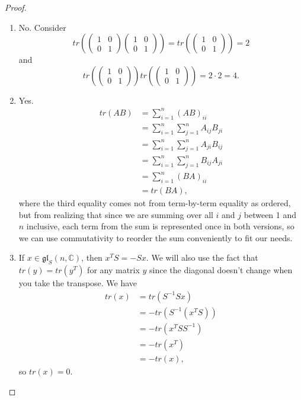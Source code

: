 \documentclass[12pt]{article}
\newcommand{\gl}{\mathfrak{gl}}
\theoremstyle{definition}
\begin{document}
\begin{proof}\
	\begin{enumerate}[label=(\alph*)]
		\item No.
		      Consider \begin{equation*}
			      tr \left( \begin{pmatrix}1 & 0 \\ 0 & 1\end{pmatrix}\begin{pmatrix}1 & 0 \\ 0 & 1\end{pmatrix} \right) = tr \left( \begin{pmatrix}1 & 0 \\ 0 & 1\end{pmatrix} \right) = 2
		      \end{equation*}
		      and \begin{equation*}
			      tr \left( \begin{pmatrix}1 & 0 \\ 0 & 1\end{pmatrix}\right) tr\left(\begin{pmatrix}1 & 0 \\ 0 & 1\end{pmatrix} \right) = 2 \cdot 2 = 4.
		      \end{equation*}
		\item Yes. \begin{align*}
			      tr(AB) & = \sum_{i=1}^n (AB)_{ii}                 \\
			             & = \sum_{i=1}^n \sum_{j=1}^n A_{ij}B_{ji} \\
			             & = \sum_{i=1}^n \sum_{j=1}^n A_{ji}B_{ij} \\
			             & = \sum_{i=1}^n \sum_{j=1}^n B_{ij}A_{ji} \\
			             & = \sum_{i=1}^n (BA)_{ii}                 \\
			             & = tr(BA),
		      \end{align*}
		      where the third equality comes not from term-by-term equality as ordered, but from realizing that since we are summing over all $i$ and $j$ between 1 and $n$ inclusive, each term from the sum is represented once in both versions, so we can use commutativity to reorder the sum conveniently to fit our needs.
		\item If $x \in \gl_S(n, \mathbb{C})$, then $x^TS = -Sx$.
		      We will also use the fact that $tr(y) = tr(y^T)$ for any matrix $y$ since the diagonal doesn't change when you take the transpose.
		      We have \begin{align*}
			      tr(x) & = tr(S^{-1}Sx)      \\
			            & = -tr(S^{-1}(x^TS)) \\
			            & = -tr(x^TSS^{-1})   \\
			            & = -tr(x^T)          \\
			            & = -tr(x),
		      \end{align*}
		      so $tr(x) = 0$.
	\end{enumerate}
\end{proof}
\end{document}
